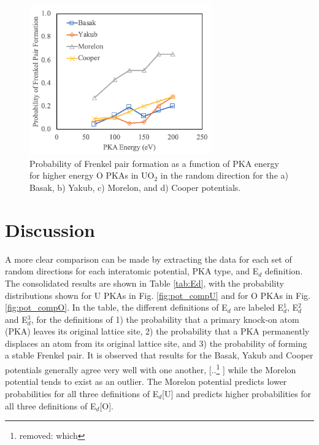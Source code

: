 \documentclass[review]{elsarticle}
\providecommand{\DIFaddtex}[1]{{\protect\color{blue} \sf #1}} %
\providecommand{\DIFdeltex}[1]{{\protect\color{red} [..\footnote{removed: #1} ]}} %
\providecommand{\DIFaddbegin}{} %
\providecommand{\DIFaddend}{} %
\providecommand{\DIFdelbegin}{} %
\providecommand{\DIFdelend}{} %
\providecommand{\DIFaddbeginFL}{} %
\providecommand{\DIFaddendFL}{} %
\providecommand{\DIFdelbeginFL}{} %
\providecommand{\DIFdelendFL}{} %
\providecommand{\DIFadd}[1]{\texorpdfstring{\DIFaddtex{#1}}{#1}} %
\providecommand{\DIFdel}[1]{\texorpdfstring{\DIFdeltex{#1}}{}} %
\newcommand{\DIFscaledelfig}{0.5}
\newlength{\DIFdelgraphicswidth} %
\newlength{\DIFdelgraphicsheight} %
\newcommand{\DIFaddincludegraphics}[2][]{{\color{blue}\fbox{\DIFOincludegraphics[#1]{#2}}}} %
\newcommand{\DIFdelincludegraphics}[2][]{%
\sbox{\DIFdelgraphicsbox}{\DIFOincludegraphics[#1]{#2}}%
\settoboxwidth{\DIFdelgraphicswidth}{\DIFdelgraphicsbox} %
\settoboxtotalheight{\DIFdelgraphicsheight}{\DIFdelgraphicsbox} %
\scalebox{\DIFscaledelfig}{%
\parbox[b]{\DIFdelgraphicswidth}{\usebox{\DIFdelgraphicsbox}\\[-\baselineskip] \rule{\DIFdelgraphicswidth}{0em}}\llap{\resizebox{\DIFdelgraphicswidth}{\DIFdelgraphicsheight}{%
\setlength{\unitlength}{\DIFdelgraphicswidth}%
\begin{picture}(1,1)%
\thicklines\linethickness{2pt} %
{\color[rgb]{1,0,0}\put(0,0){\framebox(1,1){}}}%
{\color[rgb]{1,0,0}\put(0,0){\line( 1,1){1}}}%
{\color[rgb]{1,0,0}\put(0,1){\line(1,-1){1}}}%
\end{picture}%
}\hspace*{3pt}}} %
} %
\DeclareRobustCommand{\DIFaddbegin}{\DIFOaddbegin \let\includegraphics\DIFaddincludegraphics} %
\DeclareRobustCommand{\DIFaddend}{\DIFOaddend \let\includegraphics\DIFOincludegraphics} %
\DeclareRobustCommand{\DIFdelbegin}{\DIFOdelbegin \let\includegraphics\DIFdelincludegraphics} %
\DeclareRobustCommand{\DIFdelend}{\DIFOaddend \let\includegraphics\DIFOincludegraphics} %
\DeclareRobustCommand{\DIFaddbeginFL}{\DIFOaddbeginFL \let\includegraphics\DIFaddincludegraphics} %
\DeclareRobustCommand{\DIFaddendFL}{\DIFOaddendFL \let\includegraphics\DIFOincludegraphics} %
\DeclareRobustCommand{\DIFdelbeginFL}{\DIFOdelbeginFL \let\includegraphics\DIFdelincludegraphics} %
\DeclareRobustCommand{\DIFdelendFL}{\DIFOaddendFL \let\includegraphics\DIFOincludegraphics} %
\begin{document}
\begin{figure}[h]
 \centering
 \DIFdelbeginFL %
\DIFdelendFL \DIFaddbeginFL \includegraphics[width=0.7\textwidth]{FP_OE.png}
 \DIFaddendFL \caption{Probability of Frenkel pair formation as a function of PKA energy for higher energy O PKAs in UO$_2$ in the random direction for the a) Basak, b) Yakub, c) Morelon, and d) Cooper potentials.}
 \label{fig:fpoe}
\end{figure}

\FloatBarrier

\section{Discussion}

A more clear comparison can be made by extracting the data for each set of random directions for each interatomic potential, PKA type, and E$_d$ definition. The consolidated results are shown in Table \ref{tab:Ed}, with the probability distributions shown for U PKAs in Fig. \ref{fig:pot_compU} and for O PKAs in Fig. \ref{fig:pot_compO}. In the table, the different definitions of E$_d$ are labeled E$_d^1$, E$_d^2$ and E$_d^3$, for the definitions of 1) the probability that a primary knock-on atom (PKA) leaves its original lattice site, 2) the probability that a PKA permanently displaces an atom from its original lattice site, and 3) the probability of forming a stable Frenkel pair. It is observed that results for the Basak, Yakub and Cooper potentials generally agree very well with one another, \DIFdelbegin \DIFdel{which }\DIFdelend \DIFaddbegin \DIFadd{while }\DIFaddend the Morelon potential tends to exist as an outlier. The Morelon potential predicts lower probabilities for all three definitions of E$_d$[U] and predicts higher probabilities for all three definitions  of E$_d$[O].
\end{document}
